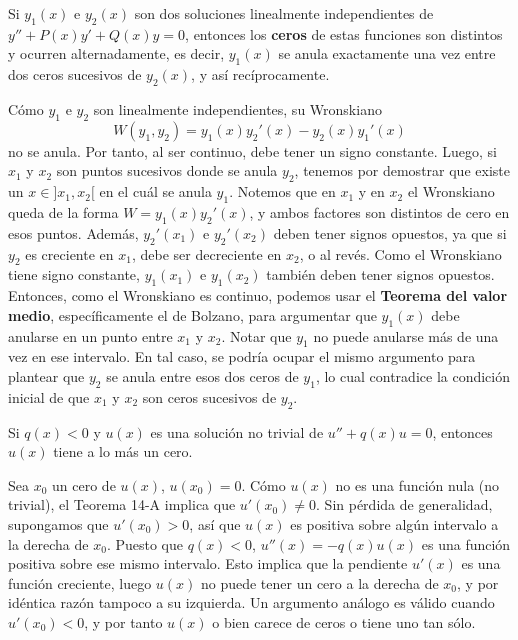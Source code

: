 \begin{theorem}
	Si $y_1 (x)$ e $y_2(x)$ son dos soluciones linealmente independientes de $y''+P(x)y' + Q(x)y = 0$, entonces los \textbf{ceros} de estas funciones son distintos y ocurren alternadamente, es decir, $y_1 (x)$ se anula exactamente una vez entre dos ceros sucesivos de $y_2 (x)$, y así recíprocamente.
\end{theorem}
\begin{demo}
	Cómo $y_1$ e $y_2$ son linealmente independientes, su Wronskiano $$W(y_1,y_2) = y_1(x)y_2'(x) - y_2(x)y_1'(x)$$
	no se anula. Por tanto, al ser continuo, debe tener un signo constante. Luego, si $x_1$ y $x_2$ son puntos sucesivos donde se anula $y_2$, tenemos por demostrar que existe un $x \in ]x_1 , x_2[$  en el cuál se anula $y_1$.\newline
	Notemos que en $x_1$ y en $x_2$ el Wronskiano queda de la forma $W = y_1(x)y_2'(x)$, y ambos factores son distintos de cero en esos puntos. Además, $y_2'(x_1)$ e $y_2'(x_2)$ deben tener signos opuestos, ya que si $y_2$ es creciente en $x_1$, debe ser decreciente en $x_2$, o al revés. Como el Wronskiano tiene signo constante, $y_1(x_1)$ e $y_1(x_2)$ también deben tener signos opuestos. Entonces, como el Wronskiano es continuo, podemos usar el \textbf{Teorema del valor medio}, específicamente el de Bolzano, para argumentar que $y_1(x)$ debe anularse en un punto entre $x_1$ y $x_2$. Notar que $y_1$ no puede anularse más de una vez en ese intervalo. En tal caso, se podría ocupar el mismo argumento para plantear que $y_2$ se anula entre esos dos ceros de $y_1$, lo cual contradice la condición inicial de que $x_1$ y $x_2$ son ceros sucesivos de $y_2$.
	
\end{demo}
\begin{theorem}
	Si $q(x) < 0$ y $u(x)$ es una solución no trivial de $u'' + q(x)u = 0$, entonces $u(x)$ tiene a lo más un cero.
\end{theorem}
\begin{demo}
	Sea $x_0$ un cero de $u(x)$, $u(x_0) = 0$. Cómo $u(x)$ no es una función nula (no trivial), el Teorema 14-A implica que $u'(x_0) \neq 0$. Sin pérdida de generalidad, supongamos que $u'(x_0) > 0$, así que $u(x)$ es positiva sobre algún intervalo a la derecha de $x_0$. Puesto que $q(x) < 0$, $u''(x) = -q(x)u(x)$ es una función positiva sobre ese mismo intervalo. Esto implica que la pendiente $u'(x)$ es una función creciente, luego $u(x)$ no puede tener un cero a la derecha de $x_0$, y por idéntica razón tampoco a su izquierda. Un argumento análogo es válido cuando $u'(x_0) < 0$, y por tanto $u(x)$ o bien carece de ceros o tiene uno tan sólo.
\end{demo}

